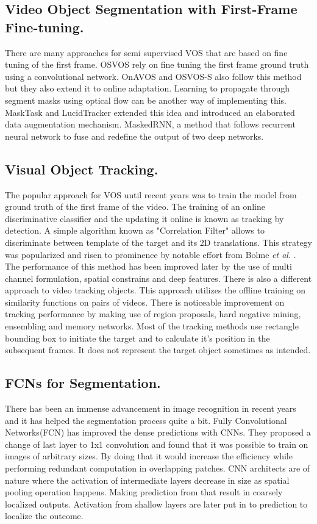\documentclass[conference]{IEEEtran}
\begin{document}
\subsection{Video Object Segmentation with First-Frame Fine-tuning.} There are many approaches for semi supervised VOS that are based on fine tuning of the first frame. OSVOS\cite{caelles2017one} rely on fine tuning the first frame ground truth using a convolutional network. OnAVOS\cite{voigtlaender2017online} and OSVOS-S\cite{maninis2018video} also follow this method but they also extend it to online adaptation. Learning to propagate through segment masks using optical flow can be another way of implementing this. MaskTask\cite{koike2020learning} and LucidTracker\cite{khoreva2017lucid} extended this idea and introduced an elaborated data augmentation mechanism. MaskedRNN\cite{hu2017maskrnn}, a method that follows recurrent neural network to fuse and redefine the output of two deep networks. 
\subsection{Visual Object Tracking.}
The popular approach for VOS until recent years was to train the model from ground truth of the first frame of the video. The training of an online discriminative classifier and the updating it online is known as tracking by detection. A simple algorithm known as "Correlation Filter" allows to discriminate between template of the target and its 2D translations. This strategy was popularized and risen to prominence by notable effort from Bolme \emph{et al.} \cite{bolme2010visual}. The performance of this method has been improved later by the use of multi channel  formulation, spatial constrains and deep features. There is also a different approach to video tracking objects. This approach utilizes the offline training on similarity functions on pairs of videos\cite{bertinetto2016fully}. There is noticeable improvement on tracking performance by making use of region proposals, hard negative mining, ensembling and memory networks. Most of the tracking methods use rectangle bounding box to initiate the target and to calculate it's position in the subsequent frames. It does not represent the target object sometimes as intended.
\subsection{FCNs for Segmentation.} There has been an immense advancement in image recognition in recent years and it has helped the segmentation process quite a bit. Fully Convolutional Networks(FCN)\cite{long2015fully} has improved the dense predictions with CNNs. They proposed a change of last layer to 1x1 convolution and found that it was possible to train on images of arbitrary sizes. By doing that it would increase the efficiency while performing redundant computation in overlapping patches. CNN architects are of nature where the activation of intermediate layers decrease in size as spatial pooling operation happens. Making prediction from that result in coarsely localized outputs. Activation from shallow layers are later put in to prediction to localize the outcome. 
\end{document}
